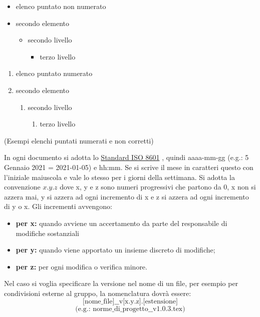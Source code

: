         \begin{multicols}{2}
            \begin{itemize}
                \item elenco puntato non numerato
                \item secondo elemento
                \begin{itemize}
                    \item secondo livello
                    \begin{itemize}
                        \item terzo livello
                    \end{itemize}
                \end{itemize}
            \end{itemize}
            \begin{enumerate}
                \item elenco puntato numerato
                \item secondo elemento
                \begin{enumerate}
                    \item secondo livello
                    \begin{enumerate}
                        \item terzo livello
                    \end{enumerate}
                \end{enumerate}
            \end{enumerate}
        \end{multicols}
        \centerline{(Esempi elenchi puntati numerati e non corretti)}
        In ogni documento si adotta lo \href{https://www.iso.org/iso-8601-date-and-time-format.html}{Standard ISO 8601} , quindi aaaa-mm-gg (e.g.: 5 Gennaio 2021 = 2021-01-05) e hh:mm. Se si scrive il mese in caratteri questo con l'iniziale maiuscola e vale lo stesso per i giorni della settimana.
        \label{versions}
        Si adotta la convenzione $x.y.z$ dove x, y e z sono numeri progressivi che partono da 0, x non si azzera mai, y si azzera ad ogni incremento di x e z si azzera ad ogni incremento di y o x. Gli incrementi avvengono:
        \begin{itemize}
            \item \textbf{per x: }quando avviene un accertamento da parte del responsabile di modifiche sostanziali
            \item \textbf{per y: }quando viene apportato un insieme discreto di modifiche;
            \item \textbf{per z: }per ogni modifica o verifica minore.
        \end{itemize}
        Nel caso si voglia specificare la versione nel nome di un file, per esempio per condivisioni esterne al gruppo, la nomenclatura dovrà essere: $$\text{[nome\_file]\_\_v[x.y.z].[estensione]}$$ $$\text{(e.g.: norme\_di\_progetto\_\_v1.0.3.tex)}$$

